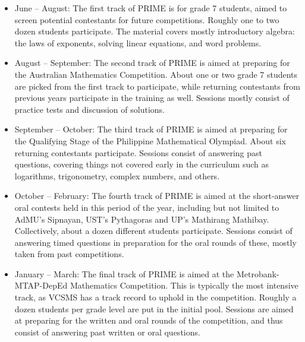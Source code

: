 \documentclass[10pt,paper=letter]{scrartcl}
\begin{document}
\begin{itemize}

\item June -- August: The first track of PRIME is for grade 7 students, aimed to screen potential contestants for future competitions. Roughly one to two dozen students participate. The material covers mostly introductory algebra: the laws of exponents, solving linear equations, and word problems.

\item August -- September: The second track of PRIME is aimed at preparing for the Australian Mathematics Competition. About one or two grade 7 students are picked from the first track to participate, while returning contestants from previous years participate in the training as well. Sessions mostly consist of practice tests and discussion of solutions.

\item September -- October: The third track of PRIME is aimed at preparing for the Qualifying Stage of the Philippine Mathematical Olympiad. About six returning contestants participate. Sessions consist of answering past questions, covering things not covered early in the curriculum such as logarithms, trigonometry, complex numbers, and others.

\item October -- February: The fourth track of PRIME is aimed at the short-answer oral contests held in this period of the year, including but not limited to AdMU's Sipnayan, UST's Pythagoras and UP's Mathirang Mathibay. Collectively, about a dozen different students participate. Sessions consist of answering timed questions in preparation for the oral rounds of these, mostly taken from past competitions.

\item January -- March: The final track of PRIME is aimed at the Metrobank-MTAP-DepEd Mathematics Competition. This is typically the most intensive track, as VCSMS has a track record to uphold in the competition. Roughly a dozen students per grade level are put in the initial pool. Sessions are aimed at preparing for the written and oral rounds of the competition, and thus consist of answering past written or oral questions.

\end{itemize}
\end{document}
